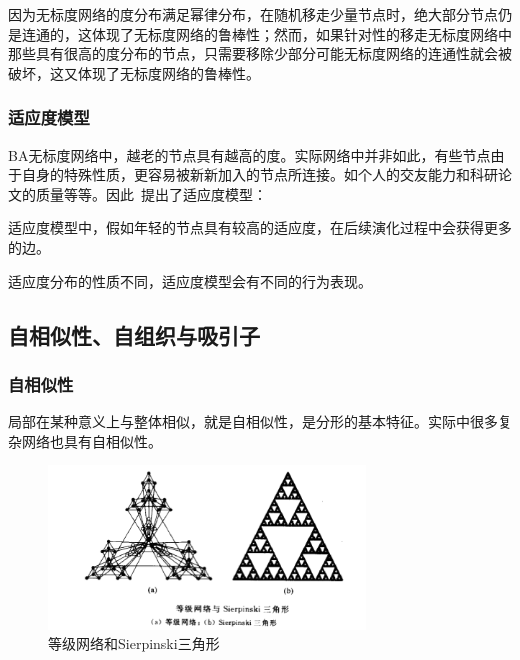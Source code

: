 \documentclass[11pt]{article}
\begin{document}
			因为无标度网络的度分布满足幂律分布，在随机移走少量节点时，绝大部分节点仍是连通的，这体现了无标度网络的鲁棒性；然而，如果针对性的移走无标度网络中那些具有很高的度分布的节点，只需要移除少部分可能无标度网络的连通性就会被破坏，这又体现了无标度网络的鲁棒性。
			
			
			\subsubsection*{适应度模型}
				BA无标度网络中，越老的节点具有越高的度。实际网络中并非如此，有些节点由于自身的特殊性质，更容易被新新加入的节点所连接。如个人的交友能力和科研论文的质量等等。因此~\cite{paper_05}提出了适应度模型：\par
				
				\begin{center}	
				\end{center} \par
				适应度模型中，假如年轻的节点具有较高的适应度，在后续演化过程中会获得更多的边。\par
				适应度分布的性质不同，适应度模型会有不同的行为表现。
				
	\subsection{自相似性、自组织与吸引子}
	
		\subsubsection*{自相似性}
			局部在某种意义上与整体相似，就是自相似性，是分形的基本特征。实际中很多复杂网络也具有自相似性。\par
			
			\begin{figure}[htbp]
				\centering
				\includegraphics[width=0.75\textwidth]{pic/01-self.png}
				\caption{等级网络和Sierpinski三角形}
			\end{figure}
			
\end{document}
